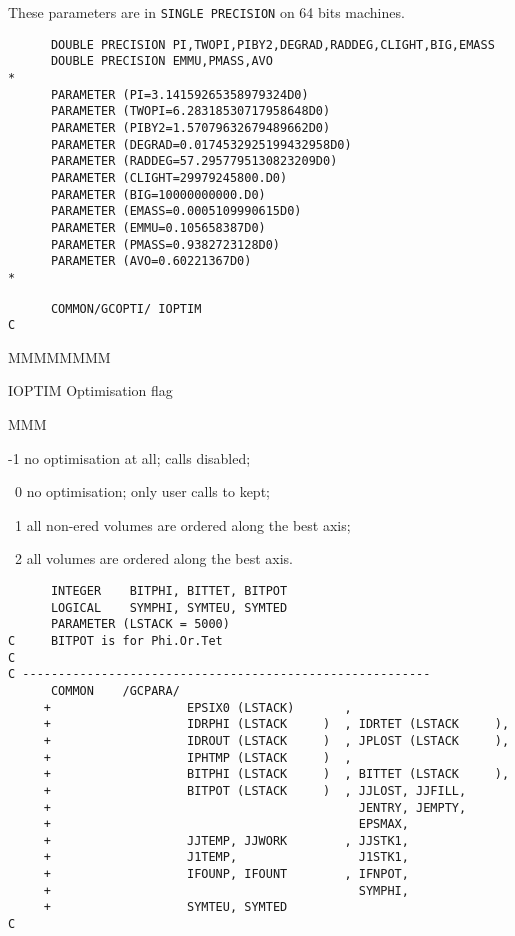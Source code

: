 These parameters are in {\tt SINGLE PRECISION} on 64 bits machines.
\begin{verbatim}
      DOUBLE PRECISION PI,TWOPI,PIBY2,DEGRAD,RADDEG,CLIGHT,BIG,EMASS
      DOUBLE PRECISION EMMU,PMASS,AVO
*
      PARAMETER (PI=3.14159265358979324D0)
      PARAMETER (TWOPI=6.28318530717958648D0)
      PARAMETER (PIBY2=1.57079632679489662D0)
      PARAMETER (DEGRAD=0.0174532925199432958D0)
      PARAMETER (RADDEG=57.2957795130823209D0)
      PARAMETER (CLIGHT=29979245800.D0)
      PARAMETER (BIG=10000000000.D0)
      PARAMETER (EMASS=0.0005109990615D0)
      PARAMETER (EMMU=0.105658387D0)
      PARAMETER (PMASS=0.9382723128D0)
      PARAMETER (AVO=0.60221367D0)
*
\end{verbatim}
\begin{verbatim}
      COMMON/GCOPTI/ IOPTIM
C
\end{verbatim}
\begin{DLtt}{MMMMMMMM}
\item[IOPTIM]Optimisation flag
\begin{DLtt}{MMM}
\item[-1] no optimisation at all;  calls disabled;
\item[~0] no optimisation; only user calls to  kept;
\item[~1] all non-ered volumes are ordered along the best axis;
\item[~2] all volumes are ordered along the best axis.
\end{DLtt}
\end{DLtt}
\begin{verbatim}
      INTEGER    BITPHI, BITTET, BITPOT
      LOGICAL    SYMPHI, SYMTEU, SYMTED
      PARAMETER (LSTACK = 5000)
C     BITPOT is for Phi.Or.Tet
C
C ---------------------------------------------------------
      COMMON    /GCPARA/
     +                   EPSIX0 (LSTACK)       ,
     +                   IDRPHI (LSTACK     )  , IDRTET (LSTACK     ),
     +                   IDROUT (LSTACK     )  , JPLOST (LSTACK     ),
     +                   IPHTMP (LSTACK     )  ,
     +                   BITPHI (LSTACK     )  , BITTET (LSTACK     ),
     +                   BITPOT (LSTACK     )  , JJLOST, JJFILL,
     +                                           JENTRY, JEMPTY,
     +                                           EPSMAX,
     +                   JJTEMP, JJWORK        , JJSTK1,
     +                   J1TEMP,                 J1STK1,
     +                   IFOUNP, IFOUNT        , IFNPOT,
     +                                           SYMPHI,
     +                   SYMTEU, SYMTED
C
\end{verbatim}
